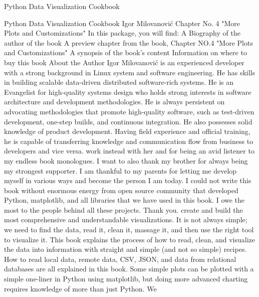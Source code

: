 Python Data Visualization Cookbook



Python Data Visualization Cookbook
Igor Milovanović
Chapter No. 4
"More Plots and Customizations"
In this package, you will find:
A Biography of the author of the book
A preview chapter from the book, Chapter NO.4 "More Plots and Customizations"
A synopsis of the book’s content
Information on where to buy this book
About the Author
Igor Milovanović is an experienced developer with a strong background in Linux
system and software engineering. He has skills in building scalable data-driven
distributed software-rich systems.
He is an Evangelist for high-quality systems design who holds strong interests
in software architecture and development methodologies. He is always persistent
on advocating methodologies that promote high-quality software, such as test-driven
development, one-step builds, and continuous integration.
He also possesses solid knowledge of product development. Having field experience
and official training, he is capable of transferring knowledge and communication flow
from business to developers and vice versa.
\newpage %
work instead with her and for being an avid listener to my endless book
monologues. I want to also thank my brother for always being my strongest
supporter. I am thankful to my parents for letting me develop myself in
various ways and become the person I am today.
I could not write this book without enormous energy from open source
community that developed Python, matplotlib, and all libraries that we
have used in this book. I owe the most to the people behind all these
projects. Thank you.
\newpage %
create and build the most comprehensive and understandable visualizations. It is not
always simple; we need to find the data, read it, clean it, massage it, and then use the
right tool to visualize it. This book explains the process of how to read, clean, and
visualize the data into information with straight and simple (and not so simple) recipes.
How to read local data, remote data, CSV, JSON, and data from relational databases
are all explained in this book.
Some simple plots can be plotted with a simple one-liner in Python using matplotlib,
but doing more advanced charting requires knowledge of more than just Python. We
